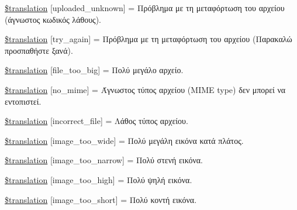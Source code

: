 \begin{DoxyCompactItemize}
\item 
\hyperlink{class_8upload_8el___g_r_8php_a4a9168e922b827e6a28b5db1c00774ca}{\$translation} \mbox{[}\textquotesingle{}uploaded\+\_\+unknown\textquotesingle{}\mbox{]} = \textquotesingle{}Πρόβλημα με τη μεταφόρτωση του αρχείου (άγνωστος κωδικός λάθους).\textquotesingle{}
\item 
\hyperlink{class_8upload_8el___g_r_8php_a3afc377bd803683314f413a814243066}{\$translation} \mbox{[}\textquotesingle{}try\+\_\+again\textquotesingle{}\mbox{]} = \textquotesingle{}Πρόβλημα με τη μεταφόρτωση του αρχείου (Παρακαλώ προσπαθήστε ξανά).\textquotesingle{}
\item 
\hyperlink{class_8upload_8el___g_r_8php_a476278eb4a0c3df56af068e2d511a741}{\$translation} \mbox{[}\textquotesingle{}file\+\_\+too\+\_\+big\textquotesingle{}\mbox{]} = \textquotesingle{}Πολύ μεγάλο αρχείο.\textquotesingle{}
\item 
\hyperlink{class_8upload_8el___g_r_8php_a191a55df8e3bb7f3c51b70f3c1932e02}{\$translation} \mbox{[}\textquotesingle{}no\+\_\+mime\textquotesingle{}\mbox{]} = \textquotesingle{}Άγνωστος τύπος αρχείου (M\+I\+M\+E type) δεν μπορεί να εντοπιστεί.\textquotesingle{}
\item 
\hyperlink{class_8upload_8el___g_r_8php_a4d32343e2699edd6fd435f9c832cb9c7}{\$translation} \mbox{[}\textquotesingle{}incorrect\+\_\+file\textquotesingle{}\mbox{]} = \textquotesingle{}Λάθος τύπος αρχείου.\textquotesingle{}
\item 
\hyperlink{class_8upload_8el___g_r_8php_a0dd3e4930ca1f59ae280f4b1006525cd}{\$translation} \mbox{[}\textquotesingle{}image\+\_\+too\+\_\+wide\textquotesingle{}\mbox{]} = \textquotesingle{}Πολύ μεγάλη εικόνα κατά πλάτος.\textquotesingle{}
\item 
\hyperlink{class_8upload_8el___g_r_8php_a5c9a4cd67fd21c32e0a3b434591a6037}{\$translation} \mbox{[}\textquotesingle{}image\+\_\+too\+\_\+narrow\textquotesingle{}\mbox{]} = \textquotesingle{}Πολύ στενή εικόνα.\textquotesingle{}
\item 
\hyperlink{class_8upload_8el___g_r_8php_aa27bde361343f3b63c7cd441860024f8}{\$translation} \mbox{[}\textquotesingle{}image\+\_\+too\+\_\+high\textquotesingle{}\mbox{]} = \textquotesingle{}Πολύ ψηλή εικόνα.\textquotesingle{}
\item 
\hyperlink{class_8upload_8el___g_r_8php_a86fcd4e1157b00032df451188d735527}{\$translation} \mbox{[}\textquotesingle{}image\+\_\+too\+\_\+short\textquotesingle{}\mbox{]} = \textquotesingle{}Πολύ κοντή εικόνα.\textquotesingle{}
\item 

\end{DoxyCompactItemize}
